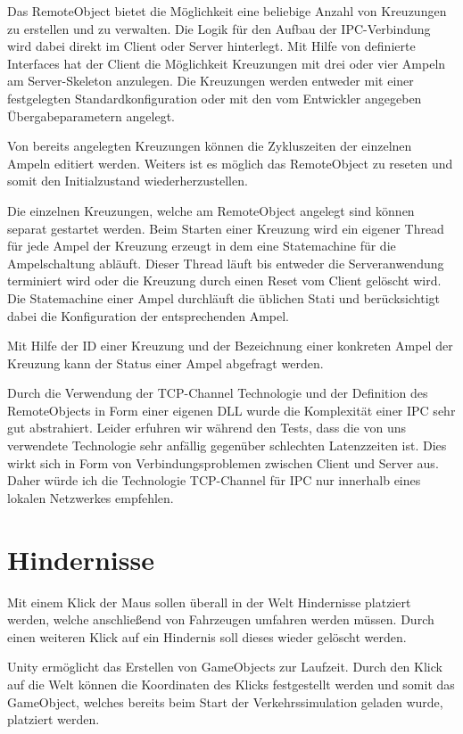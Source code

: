 Das RemoteObject bietet die Möglichkeit eine beliebige Anzahl von Kreuzungen zu erstellen und zu verwalten. Die Logik für den Aufbau der IPC-Verbindung wird dabei direkt im Client oder Server hinterlegt. Mit Hilfe von definierte Interfaces hat der Client die Möglichkeit Kreuzungen mit drei oder vier Ampeln am Server-Skeleton anzulegen. Die Kreuzungen werden entweder mit einer festgelegten Standardkonfiguration oder mit den vom Entwickler angegeben Übergabeparametern angelegt.

Von bereits angelegten Kreuzungen können die Zykluszeiten der einzelnen Ampeln editiert werden. Weiters ist es möglich das RemoteObject zu reseten und somit den Initialzustand wiederherzustellen.

Die einzelnen Kreuzungen, welche am RemoteObject angelegt sind können separat gestartet werden. Beim Starten einer Kreuzung wird ein eigener Thread für jede Ampel der Kreuzung erzeugt in dem eine Statemachine für die Ampelschaltung abläuft. Dieser Thread läuft bis entweder die Serveranwendung terminiert wird oder die Kreuzung durch einen Reset vom Client gelöscht wird. Die Statemachine einer Ampel durchläuft die üblichen Stati und berücksichtigt dabei die Konfiguration der entsprechenden Ampel. 

Mit Hilfe der ID einer Kreuzung und der Bezeichnung einer konkreten Ampel der Kreuzung kann der Status einer Ampel abgefragt werden.

Durch die Verwendung der TCP-Channel Technologie und der Definition des RemoteObjects in Form einer eigenen DLL wurde die Komplexität einer IPC sehr gut abstrahiert. Leider erfuhren wir während den Tests, dass die von uns verwendete Technologie sehr anfällig gegenüber schlechten Latenzzeiten ist. Dies wirkt sich in Form von Verbindungsproblemen zwischen Client und Server aus. Daher würde ich die Technologie TCP-Channel für IPC nur innerhalb eines lokalen Netzwerkes empfehlen.


\section{Hindernisse}
\label{Hindernisse}

Mit einem Klick der Maus sollen überall in der Welt Hindernisse platziert werden, welche anschließend von Fahrzeugen umfahren werden müssen. Durch einen weiteren Klick auf ein Hindernis soll dieses wieder gelöscht werden. 

Unity ermöglicht das Erstellen von GameObjects zur Laufzeit. Durch den Klick auf die Welt können die Koordinaten des Klicks festgestellt werden und somit das GameObject, welches bereits beim Start der Verkehrssimulation geladen wurde, platziert werden.


